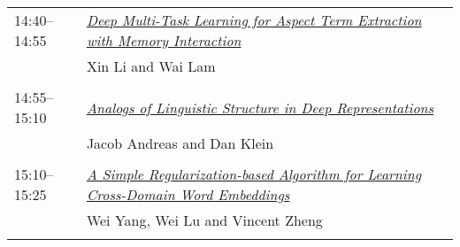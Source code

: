 \begin{tabular}{p{20mm}p{128mm}}
14:40--14:55 & \hyperlink{page.2869}{\em Deep Multi-Task Learning for Aspect Term Extraction with Memory Interaction}\\
         & Xin Li and Wai Lam \\
\\

14:55--15:10 & \hyperlink{page.2876}{\em Analogs of Linguistic Structure in Deep Representations}\\
         & Jacob Andreas and Dan Klein \\
\\

15:10--15:25 & \hyperlink{page.2881}{\em A Simple Regularization-based Algorithm for Learning Cross-Domain Word Embeddings}\\
         & Wei Yang, Wei Lu and Vincent Zheng \\
\\

\end{tabular}
\newpage
